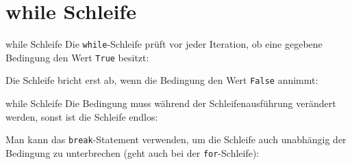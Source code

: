 \section{while Schleife}
	\begin{frame}{while Schleife}
		Die \alert{\texttt{while}}-Schleife prüft vor jeder Iteration, ob eine gegebene Bedingung den Wert \alert{\texttt{True}} besitzt:
		
		Die Schleife bricht erst ab, wenn die Bedingung den Wert \alert{\texttt{False}} annimmt:
		
	\end{frame}
	
	\begin{frame}{while Schleife}
	Die Bedingung muss während der Schleifenausführung verändert werden, sonst ist die Schleife endlos:
	
	Man kann das \alert{\texttt{break}}-Statement verwenden, um die Schleife auch unabhängig der Bedingung zu unterbrechen (geht auch bei der \alert{\texttt{for}}-Schleife):
	
	\end{frame}

